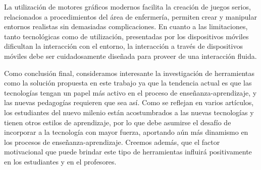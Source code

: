 La utilización de motores gráficos modernos facilita la creación de juegos
serios, relacionados a procedimientos del área de enfermería, permiten crear y
manipular entornos realistas sin demasiadas complicaciones. En cuanto a las
limitaciones, tanto tecnológicas como de utilización, presentadas por los
dispositivos móviles dificultan la interacción con el entorno, la interacción a
través de dispositivos móviles debe ser cuidadosamente diseñada para proveer de
una interacción fluida. 

Como conclusión final, consideramos interesante la investigación de herramientas
como la solución propuesta en este trabajo ya que la tendencia actual es que las
tecnologías tengan un papel más activo en el proceso de enseñanza-aprendizaje, y
las nuevas pedagogías requieren que sea así. Como se reflejan en varios
artículos, los estudiantes del nuevo milenio están acostumbrados a las nuevas
tecnologías y tienen otros estilos de aprendizaje, por lo que debe asumirse el
desafío de incorporar a la tecnología con mayor fuerza, aportando aún más
dinamismo en los procesos de enseñanza-aprendizaje. Creemos además, que el
factor motivacional que puede brindar este tipo de herramientas influirá
positivamente en los estudiantes y en el profesores.





